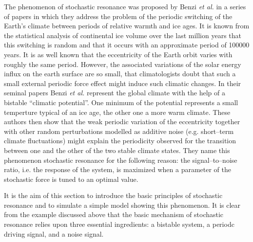 The phenomenon of stochastic resonance was proposed by Benzi \textit{et al.}
\cite{Benzi,Benzi2} in a series of papers in which they address the problem
of the periodic switching of the Earth's climate between periods of relative
warmth and ice ages. It is known from the statistical analysis of continental
ice volume over the last million years that this switching is random and that 
it occurs with an approximate period of 100000 years. It is as well known that
the eccentricity of the Earth orbit varies with roughly the same period. 
However,
the associated variations of the solar energy influx on the earth surface are
so small, that climatologists doubt that  such a small external periodic force
effect might induce such climatic changes. In their seminal papers Benzi
\textit{et al.} represent the global climate with the help of a bistable
``climatic potential''. One minimum of the potential represents a small
temperture typical of an ice age, the other one a more  warm climate.
These authors then show that the weak periodic variation of the eccentricity
together with other random perturbations modelled as additive noise (e.g.
short--term climate fluctuations) might explain the periodicity observed for
the transition between one and the other of the two stable climate 
states. They name this
phenomenon stochastic resonance for the following reason: the
signal--to--noise ratio, i.e. the response of the system, is maximized when a
parameter of the stochastic force is tuned to an optimal value.

It is the aim of this section to introduce the basic principles of stochastic
resonance \cite{McNamara,Gammaitoni} and to simulate a simple model 
showing this phenomenon.
It is clear from the example discussed above that the basic mechanism  of 
stochastic resonance relies upon three essential ingredients:
a bistable system, a periodc driving signal, and a noise signal.

